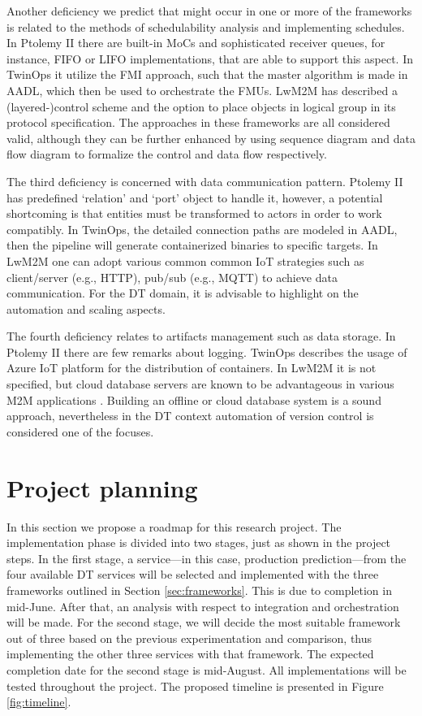 \documentclass[journal,onecolumn]{IEEEtran} %
\begin{document}
Another deficiency we predict that might occur in one or more of the frameworks is related to the methods of schedulability analysis and implementing schedules. In Ptolemy II there are built-in MoCs and sophisticated receiver queues, for instance, FIFO or LIFO implementations, that are able to support this aspect. In TwinOps it utilize the FMI approach, such that the master algorithm is made in AADL, which then be used to orchestrate the FMUs. LwM2M has described a (layered-)control scheme and the option to place objects in logical group in its protocol specification. The approaches in these frameworks are all considered valid, although they can be further enhanced by using sequence diagram and data flow diagram to formalize the control and data flow respectively.

The third deficiency is concerned with data communication pattern. Ptolemy II has predefined `relation' and `port' object to handle it, however, a potential shortcoming is that entities must be transformed to actors in order to work compatibly. In TwinOps, the detailed connection paths are modeled in AADL, then the pipeline will generate containerized binaries to specific targets. In LwM2M one can adopt various common common IoT strategies such as client/server (e.g., HTTP), pub/sub (e.g., MQTT) to achieve data communication. For the DT domain, it is advisable to highlight on the automation and scaling aspects.

The fourth deficiency relates to artifacts management such as data storage. In Ptolemy II there are few remarks about logging. TwinOps describes the usage of Azure IoT platform \cite{azureiot} for the distribution of containers. In LwM2M it is not specified, but cloud database servers are known to be advantageous in various M2M applications \cite{Verma2016}. Building an offline or cloud database system is a sound approach, nevertheless in the DT context automation of version control is considered one of the focuses. 

\pagebreak
\section{Project planning}
In this section we propose a roadmap for this research project. The implementation phase is divided into two stages, just as shown in the project steps. In the first stage, a service---in this case, production prediction---from the four available DT services will be selected and implemented with the three frameworks outlined in Section \ref{sec:frameworks}. This is due to completion in mid-June. After that, an analysis with respect to integration and orchestration will be made. For the second stage, we will decide the most suitable framework out of three based on the previous experimentation and comparison, thus implementing the other three services with that framework. The expected completion date for the second stage is mid-August. All implementations will be tested throughout the project. The proposed timeline is presented in Figure \ref{fig:timeline}.
\end{document}

